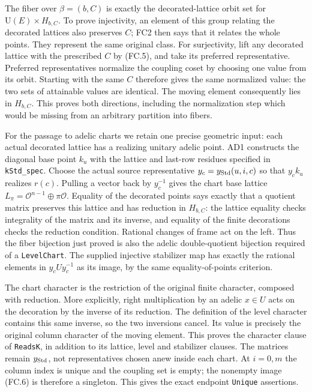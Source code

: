 \documentclass[11pt,a4paper]{article}
\numberwithin{equation}{section}
\theoremstyle{remark}\newtheorem{remark}[theorem]{Remark}
\begin{document}
The fiber over $\beta=(b,C)$ is exactly the decorated-lattice orbit
set for $\mathrm U(E)\times H_{b,C}$. To prove injectivity, an element
of this group relating the decorated lattices also preserves $C$;
FC2 then says that it relates the whole points. They represent the same
original class. For surjectivity, lift any decorated lattice with the
prescribed $C$ by (FC.5), and take its preferred representative. Preferred
representatives normalize the coupling coset by choosing one value from
its orbit. Starting with the same $C$ therefore gives the same normalized
value: the two sets of attainable values are identical. The moving
element consequently lies in $H_{b,C}$. This proves both directions,
including the normalization step which would be missing from an arbitrary
partition into fibers.

For the passage to adelic charts we retain one precise geometric input:
each actual decorated lattice has a realizing unitary adelic point.
AD1 constructs the diagonal base point $k_u$ with the lattice and
last-row residues specified in \texttt{kStd\_\allowbreak spec}. Choose the actual source representative
$y_c=y_{\rm Std}(u,i,c)$ so that $y_ck_u$ realizes $r(c)$.
Pulling a vector back by $y_c^{-1}$ gives the chart base lattice
$L_\pi=\mathcal O^{n-1}\oplus\pi\mathcal O$. Equality of the
decorated points says exactly that a quotient matrix preserves this
lattice and has reduction in $H_{b,C}$: the lattice equality checks
integrality of the matrix and its inverse, and equality of the finite
decorations checks the reduction condition. Rational changes of frame
act on the left. Thus the fiber bijection just proved is also the
adelic double-quotient bijection required of a \texttt{LevelChart}.
The supplied injective stabilizer map has exactly the rational elements
in $y_cUy_c^{-1}$ as its image, by the same equality-of-points criterion.

The chart character is the restriction of the original finite character,
composed with reduction. More explicitly, right multiplication by an
adelic $x\in U$ acts on the decoration by the inverse of its reduction.
The definition of the level character contains this same inverse, so
the two inversions cancel. Its value is precisely the original column
character of the moving element. This proves the character clause of
\texttt{ReadsK}, in addition to its lattice, level and stabilizer clauses.
The matrices remain $y_{\rm Std}$, not representatives chosen anew
inside each chart. At $i=0,m$ the column index is unique and the coupling
set is empty; the nonempty image (FC.6) is therefore a singleton.
This gives the exact endpoint \texttt{Unique} assertions.
\end{document}
